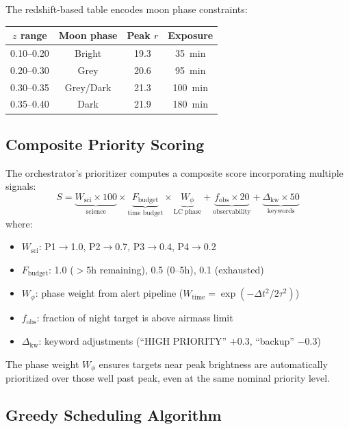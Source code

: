 \documentclass[11pt,letterpaper]{article}
\begin{document}
The redshift-based table encodes moon phase constraints:
\begin{center}
\begin{tabular}{cccc}
\toprule
$z$ range & Moon phase & Peak $r$ & Exposure \\
\midrule
0.10--0.20 & Bright & 19.3 & 35~min \\
0.20--0.30 & Grey & 20.6 & 95~min \\
0.30--0.35 & Grey/Dark & 21.3 & 100~min \\
0.35--0.40 & Dark & 21.9 & 180~min \\
\bottomrule
\end{tabular}
\end{center}

\subsection{Composite Priority Scoring}

The orchestrator's prioritizer computes a composite score incorporating
multiple signals:
\begin{equation}
S = \underbrace{W_{\mathrm{sci}} \times 100}_{\text{science}}
\times \underbrace{F_{\mathrm{budget}}}_{\text{time budget}}
\times \underbrace{W_{\phi}}_{\text{LC phase}}
+ \underbrace{f_{\mathrm{obs}} \times 20}_{\text{observability}}
+ \underbrace{\Delta_{\mathrm{kw}} \times 50}_{\text{keywords}}
\end{equation}
where:
\begin{itemize}
\item $W_{\mathrm{sci}}$: P1$\to$1.0, P2$\to$0.7, P3$\to$0.4, P4$\to$0.2
\item $F_{\mathrm{budget}}$: 1.0 ($>$5h remaining), 0.5 (0--5h), 0.1 (exhausted)
\item $W_\phi$: phase weight from alert pipeline ($W_{\mathrm{time}} = \exp(-\Delta t^2/2\tau^2)$)
\item $f_{\mathrm{obs}}$: fraction of night target is above airmass limit
\item $\Delta_{\mathrm{kw}}$: keyword adjustments (``HIGH PRIORITY'' $+0.3$, ``backup'' $-0.3$)
\end{itemize}

The phase weight $W_\phi$ ensures targets near peak brightness are
automatically prioritized over those well past peak, even at the same
nominal priority level.

\subsection{Greedy Scheduling Algorithm}
\end{document}
